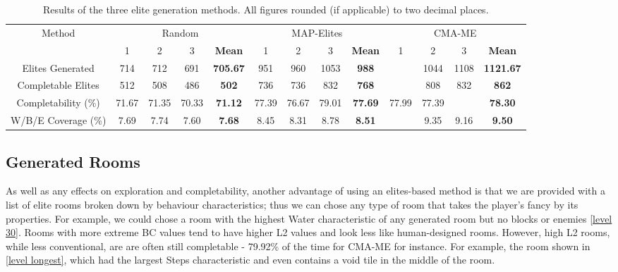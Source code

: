 \documentclass{article}
\begin{document}
\begin{table}
\begin{center}
\small
    \begin{tabular}{|c|c|c|c|c|c|c|c|c|c|c|c|c|}
        \hline
        \multirow{2}{*}{Method} 
        & \multicolumn{4}{c|}{Random} 
          & \multicolumn{4}{c|}{MAP-Elites} 
            & \multicolumn{4}{c|}{CMA-ME}\\  
                    \cline{2-13}
            & 1 & 2 & 3 & \textbf{Mean} & 1 & 2 & 3 & \textbf{Mean} & 1 & 2 & 3 & \textbf{Mean} \\
        \hline
        Elites Generated & 714 & 712 & 691 & \textbf{705.67} & 951 & 960 & 1053 & \textbf{988} & \color{YellowGreen}{1213} & 1044 & 1108 & \textbf{1121.67}\\
        \hline
        Completable Elites & 512 & 508 & 486 & \textbf{502} & 736 & 736 & 832 & \textbf{768} & \color{YellowGreen}{946} & 808 & 832 & \textbf{862}\\ 
        \hline
        Completability (\%) & 71.67 & 71.35 & 70.33 & \textbf{71.12} & 77.39 & 76.67 & 79.01 & \textbf{77.69} & 77.99 & 77.39 & \color{YellowGreen}{79.51} & \textbf{78.30}\\
        \hline
        W/B/E Coverage (\%) & 7.69 & 7.74 & 7.60 & \textbf{7.68} & 8.45 & 8.31 & 8.78 & \textbf{8.51} & \color{YellowGreen}{9.97} & 9.35 & 9.16 & \textbf{9.50}\\
        \hline
    \end{tabular}
\end{center}
\caption{Results of the three elite generation methods. All figures rounded (if applicable) to two decimal places.}
\label{table: results}
\end{table}

\subsection{Generated Rooms}


As well as any effects on exploration and completability, another advantage of using an elites-based method is that we are provided with a list of elite rooms broken down by behaviour characteristics; thus we can chose any type of room that takes the player's fancy by its properties. For example, we could chose a room with the highest Water characteristic of any generated room but no blocks or enemies \ref{level 30}. Rooms with more extreme BC values tend to have higher L2 values and look less like human-designed rooms. However, high L2 rooms, while less conventional, are are often still completable - 79.92\% of the time for CMA-ME for instance. For example, the room shown in \ref{level longest}, which had the largest Steps characteristic and even contains a void tile in the middle of the room.
\end{document}
